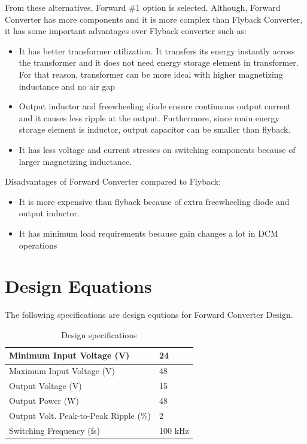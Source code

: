 \documentclass{article}
\begin{document}
From these alternatives, Forward \#1 option is selected. Although, Forward Converter has more components and it is more complex than Flyback Converter, it has some important advantages over Flyback converter such as:
\begin{itemize}
    \item It has better transformer utilization. It transfers its energy instantly across the transformer and it does not need energy storage element in transformer. For that reason, transformer can be more ideal with higher magnetizing inductance and no air gap
    \item Output inductor and freewheeling diode ensure continuous output current and it causes less ripple at the output. Furthermore, since main energy storage element is inductor, output capacitor can be smaller than flyback.
    \item It has less voltage and current stresses on switching components because of larger magnetizing inductance.
\end{itemize}
Disadvantages of Forward Converter compared to Flyback:
\begin{itemize}
    \item It is more expensive than flyback because of extra freewheeling diode and output inductor.
    \item It has minimum load requirements because gain changes a lot in DCM operations
\end{itemize}

\section{Design Equations}
The following specifications are design equtions for Forward Converter Design.
\begin{table}[H]
    \centering
\begin{tabular}{|l|l|}
    \hline
    Minimum Input Voltage (V)             & 24      \\ \hline
    Maximum Input Voltage (V)             & 48      \\ \hline
    Output Voltage (V)                    & 15      \\ \hline
    Output Power (W)                      & 48      \\ \hline
    Output Volt. Peak-to-Peak Ripple (\%) & 2       \\ \hline
    Switching Frequency (fs)              & 100 kHz \\ \hline
\end{tabular}
\caption {Design specifications}
\end{table}
\end{document}
